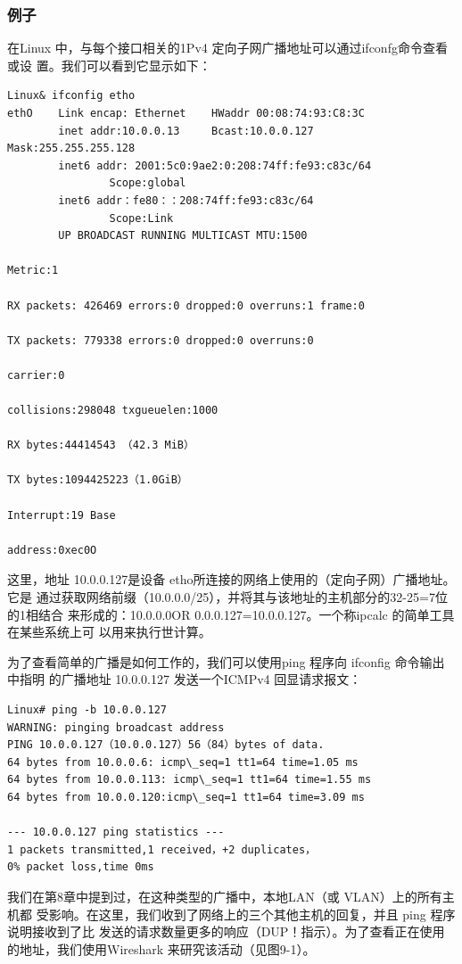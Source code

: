 \subsubsection{例子}
在Linux 中，与每个接口相关的1Pv4 定向子网广播地址可以通过ifconfg命令查看或设
置。我们可以看到它显示如下：
\begin{verbatim}
Linux& ifconfig etho
ethO    Link encap: Ethernet    HWaddr 00:08:74:93:C8:3C
        inet addr:10.0.0.13     Bcast:10.0.0.127   Mask:255.255.255.128
        inet6 addr: 2001:5c0:9ae2:0:208:74ff:fe93:c83c/64
                Scope:global
        inet6 addr：fe80：：208:74ff:fe93:c83c/64
                Scope:Link
        UP BROADCAST RUNNING MULTICAST MTU:1500

Metric:1

RX packets: 426469 errors:0 dropped:0 overruns:1 frame:0

TX packets: 779338 errors:0 dropped:0 overruns:0

carrier:0

collisions:298048 txgueuelen:1000

RX bytes:44414543 （42.3 MiB）

TX bytes:1094425223（1.0GiB）

Interrupt:19 Base

address:0xec0O
\end{verbatim}

这里，地址 10.0.0.127是设备 etho所连接的网络上使用的（定向子网）广播地址。它是
通过获取网络前缀（10.0.0.0/25），并将其与该地址的主机部分的32-25=7位的1相结合
来形成的：10.0.0.0OR 0.0.0.127=10.0.0.127。一个称ipcalc 的简单工具在某些系统上可
以用来执行世计算。

为了查看简单的广播是如何工作的，我们可以使用ping 程序向 ifconfig 命令输出中指明
的广播地址 10.0.0.127 发送一个ICMPv4 回显请求报文：

\begin{verbatim}
Linux# ping -b 10.0.0.127
WARNING: pinging broadcast address
PING 10.0.0.127（10.0.0.127）56（84）bytes of data.
64 bytes from 10.0.0.6: icmp\_seq=1 tt1=64 time=1.05 ms
64 bytes from 10.0.0.113: icmp\_seq=1 tt1=64 time=1.55 ms
64 bytes from 10.0.0.120:icmp\_seq=1 tt1=64 time=3.09 ms

--- 10.0.0.127 ping statistics ---
1 packets transmitted,1 received，+2 duplicates，
0% packet loss,time 0ms
\end{verbatim}

我们在第8章中提到过，在这种类型的广播中，本地LAN（或 VLAN）上的所有主机都
受影响。在这里，我们收到了网络上的三个其他主机的回复，并且 ping 程序说明接收到了比
发送的请求数量更多的响应（DUP！指示）。为了查看正在使用的地址，我们使用Wireshark
来研究该活动（见图9-1）。


